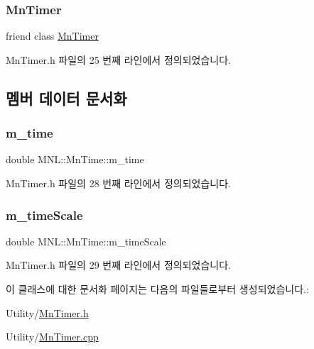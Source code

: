 \subsubsection{\texorpdfstring{Mn\+Timer}{MnTimer}}
{\footnotesize\ttfamily friend class \hyperlink{class_m_n_l_1_1_mn_timer}{Mn\+Timer}\hspace{0.3cm}{\ttfamily [friend]}}



Mn\+Timer.\+h 파일의 25 번째 라인에서 정의되었습니다.



\subsection{멤버 데이터 문서화}
\mbox{\label{class_m_n_l_1_1_mn_time_a35099377f11a843b6a7d33c9f5a97b09}} 
\subsubsection{\texorpdfstring{m\+\_\+time}{m\_time}}
{\footnotesize\ttfamily double M\+N\+L\+::\+Mn\+Time\+::m\+\_\+time\hspace{0.3cm}{\ttfamily [private]}}



Mn\+Timer.\+h 파일의 28 번째 라인에서 정의되었습니다.

\mbox{\label{class_m_n_l_1_1_mn_time_a4ffb78e819ad4cb968f56824cba7b41c}} 
\subsubsection{\texorpdfstring{m\+\_\+time\+Scale}{m\_timeScale}}
{\footnotesize\ttfamily double M\+N\+L\+::\+Mn\+Time\+::m\+\_\+time\+Scale\hspace{0.3cm}{\ttfamily [private]}}



Mn\+Timer.\+h 파일의 29 번째 라인에서 정의되었습니다.



이 클래스에 대한 문서화 페이지는 다음의 파일들로부터 생성되었습니다.\+:\begin{DoxyCompactItemize}
\item 
Utility/\hyperlink{_mn_timer_8h}{Mn\+Timer.\+h}\item 
Utility/\hyperlink{_mn_timer_8cpp}{Mn\+Timer.\+cpp}\end{DoxyCompactItemize}
